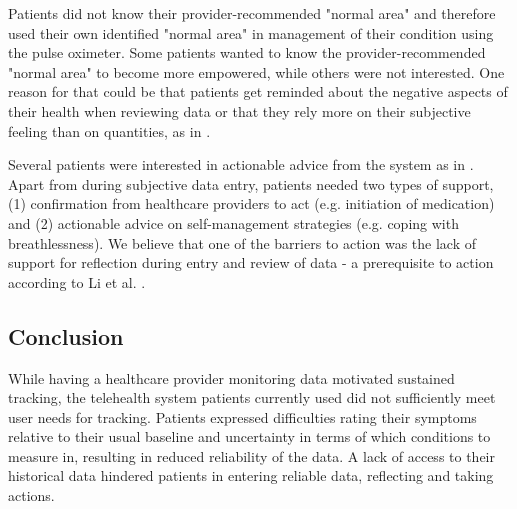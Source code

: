 Patients did not know their provider-recommended "normal area" and therefore used their own identified "normal area" in management of their condition using the pulse oximeter. Some patients wanted to know the provider-recommended "normal area" to become more empowered, while others were not interested. One reason for that could be that patients get reminded about the negative aspects of their health when reviewing data or that they rely more on their subjective feeling than on quantities, as in \cite{Ancker2015}. 

Several patients were interested in actionable advice from the system as in \cite{Chung2015, Li2010}. Apart from during subjective data entry, patients needed two types of support, (1) confirmation from healthcare providers to act (e.g. initiation of medication) and (2) actionable advice on self-management strategies (e.g. coping with breathlessness). We believe that one of the barriers to action was the lack of support for reflection during entry and review of data  - a prerequisite to action according to Li et al. \cite{Li2010}.

\subsection{Conclusion}
While having a healthcare provider monitoring data motivated sustained tracking, the telehealth system patients currently used did not sufficiently meet user needs for tracking. Patients expressed difficulties rating their symptoms relative to their usual baseline and uncertainty in terms of which conditions to measure in, resulting in reduced reliability of the data. A lack of access to their historical data hindered patients in entering reliable data, reflecting and taking actions. 